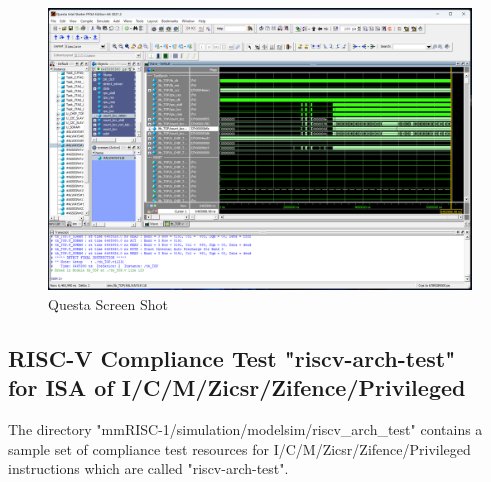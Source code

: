 \begin{figure}[H]
    \includegraphics[width=0.8\columnwidth]{./Figure/QuestaWIndow.png}
    \caption{Questa Screen Shot}
    \label{fig:QUESTAWINDOW}
\end{figure}

\subsection{RISC-V Compliance Test "riscv-arch-test" \\ for ISA of I/C/M/Zicsr/Zifence/Privileged}

The directory "mmRISC-1/simulation/modelsim/riscv\_arch\_test" contains a sample set of compliance test resources for I/C/M/Zicsr/Zifence/Privileged instructions which are called "riscv-arch-test".

